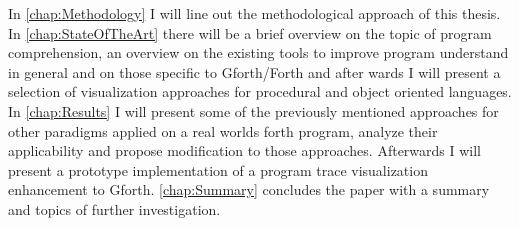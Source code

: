 In \autoref{chap:Methodology} I will line out the methodological approach of this thesis. In \autoref{chap:StateOfTheArt} there will be a brief overview on the topic of program comprehension, an overview on the existing tools to improve program understand in general and on those specific to Gforth/Forth and after wards I will present a selection of visualization approaches for procedural and object oriented languages. In \autoref{chap:Results} I will present some of the previously mentioned approaches for other paradigms applied on a real worlds forth program, analyze their applicability and propose modification to those approaches. Afterwards I will present a prototype implementation of a program trace visualization enhancement to Gforth. \autoref{chap:Summary} concludes the paper with a summary and topics of further investigation.

\begin{comment}
At first, the available information of a forth program is identified. The next step is to characterize the information and its necessity for program comprehension is investigated. The differences of forth and object oriented languages are summarized and then the applicability of existing analysis and visualization methods is presented. \hl{Since there is no standard implementation of object orientation if forth, this thesis won't take any object orientation implementation into account.}
The last part of this thesis investigates probable enhancements and modifications to existing methods and proposes new approaches.
After the conclusion, the thesis presents further suggestions to support program comprehension and further topics of research in this direction.
\end{comment}